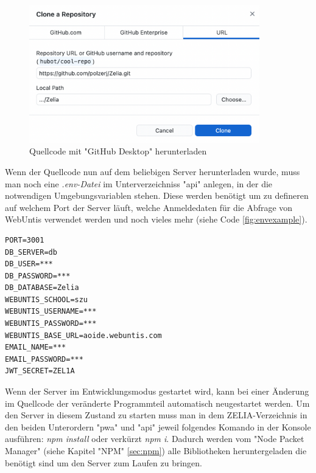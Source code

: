 \begin{figure}[H]
    \centering
    \includegraphics[width=100mm]{media/Handbuch/clone_gh.png}
    \caption{Quellcode mit "GitHub Desktop" herunterladen}
    \label{fig:clonewithdesktop}
\end{figure}


Wenn der Quellcode nun auf dem beliebigen Server herunterladen wurde, muss man noch eine \emph{.env-Datei} im Unterverzeichniss "api" anlegen, in der die notwendigen Umgebungsvariablen stehen. Diese werden benötigt um zu defineren auf welchem Port der Server läuft, welche Anmeldedaten für die Abfrage von WebUntis verwendet werden und noch vieles mehr (siehe Code \ref{fig:envexample}).


\begin{singlespace}
    \begin{lstlisting}[caption={Beispiel einer .env-Datei},label={fig:envexample},captionpos=b]
PORT=3001
DB_SERVER=db
DB_USER=***
DB_PASSWORD=***
DB_DATABASE=Zelia
WEBUNTIS_SCHOOL=szu
WEBUNTIS_USERNAME=***
WEBUNTIS_PASSWORD=***
WEBUNTIS_BASE_URL=aoide.webuntis.com
EMAIL_NAME=***
EMAIL_PASSWORD=***
JWT_SECRET=ZEL1A
    \end{lstlisting}
\end{singlespace}


Wenn der Server im Entwicklungsmodus gestartet wird, kann bei einer Änderung im Quellcode der veränderte Programmteil automatisch neugestartet werden. Um den Server in diesem Zustand zu starten muss man in dem ZELIA-Verzeichnis in den beiden Unterordern "pwa" und "api" jeweil folgendes Komando in der Konsole ausführen: \emph{npm install} oder verkürzt \emph{npm i}. Dadurch werden vom "Node Packet Manager" (siehe Kapitel "NPM" \ref{sec:npm}) alle Bibliotheken heruntergeladen die benötigt sind um den Server zum Laufen zu bringen.

